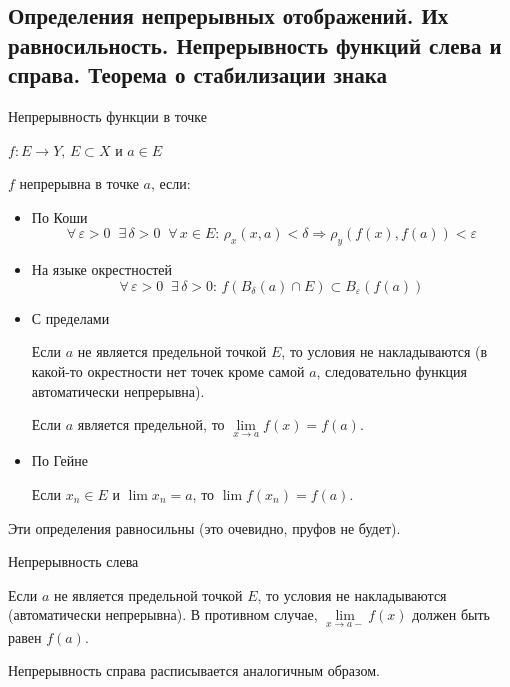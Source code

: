 \subsection{Определения непрерывных отображений. Их равносильность. Непрерывность функций слева и справа. Теорема о стабилизации знака \href{https://youtu.be/BiTNBigkkyU?t=7551}{\Walley}}

\begin{conj}
    Непрерывность функции в точке
\end{conj}
$f : E \to Y, \, E \subset X$ и $a \in E$

$f$ непрерывна в точке $a$, если:
\begin{itemize}
    \item По Коши
    \[ \forall \, \varepsilon > 0 \;\; \exists \, \delta > 0 \;\; \forall \, x \in E : \, \rho_x(x, a) < \delta \Rightarrow \rho_y(f(x), f(a)) < \varepsilon \]
    \item На языке окрестностей
    \[ \forall \, \varepsilon > 0 \;\; \exists \, \delta > 0 : \, f(B_{\delta}(a) \cap E) \subset B_{\varepsilon}(f(a)) \]
    \item С пределами
    
    Если $a$ не является предельной точкой $E$, то условия не накладываются (в какой-то окрестности нет точек кроме самой $a$, следовательно функция автоматически непрерывна).

    Если $a$ является предельной, то $\lim\limits_{x \to a} f(x) = f(a)$.
    \item По Гейне
    
    Если $x_n \in E$ и $\lim x_n = a$, то $\lim f(x_n) = f(a)$.
\end{itemize}
\begin{notice}
    Эти определения равносильны (это очевидно, пруфов не будет).
\end{notice}

\begin{conj}
    Непрерывность слева

    Если $a$ не является предельной точкой $E$, то условия не накладываются (автоматически непрерывна). 
    В противном случае, $\lim\limits_{x \to a-} f(x)$ должен быть равен $f(a)$. 
\end{conj}
\begin{notice}
    Непрерывность справа расписывается аналогичным образом.
\end{notice}

